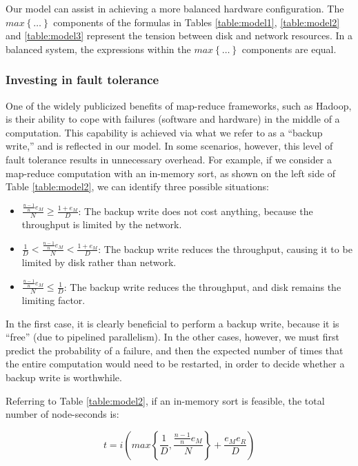 \documentclass{acm_proc_article-sp}
\begin{document}
Our model can assist in achieving a more balanced
hardware configuration. The $max\left\{\ldots\right\}$ components of the
formulas in Tables \ref{table:model1}, \ref{table:model2} and
\ref{table:model3} represent the tension between disk and network resources. In
a balanced system, the expressions within the $max\left\{\ldots\right\}$
components are equal.

\subsubsection{Investing in fault tolerance}

One of the widely publicized benefits of map-reduce frameworks, such as Hadoop,
is their ability to cope with failures (software and hardware) in the middle of
a computation. This capability is achieved via what we refer to as a ``backup
write,'' and is reflected in our model. In some scenarios, however, this level
of fault tolerance results in unnecessary overhead. For example, if we consider
a map-reduce computation with an in-memory sort, as shown on the left side of
Table \ref{table:model2}, we can identify three possible situations:

\begin{itemize}
  \item $\frac{\frac{n-1}{n} e_M}{N} \ge \frac{1+e_M}{D}$: The backup write does
  not cost anything, because the throughput is limited by the network.
  \item $\frac{1}{D} < \frac{\frac{n-1}{n} e_M}{N} < \frac{1+e_M}{D}$: The
  backup write reduces the throughput, causing it to be limited by disk rather than network.
  \item $\frac{\frac{n-1}{n} e_M}{N} \le \frac{1}{D}$: The backup write reduces
  the throughput, and disk remains the limiting factor.
\end{itemize}

In the first case, it is clearly beneficial to perform a backup write, because
it is ``free'' (due to pipelined parallelism). In the other cases, however, we
must first predict the probability of a failure, and then the expected number
of times that the entire computation would need to be restarted, in order to
decide whether a backup write is worthwhile.

Referring to Table \ref{table:model2}, if an in-memory sort is feasible, the
total number of node-seconds is:

\begin{equation*}
t = i \left( max\left\{\frac{1}{D},
\frac{\frac{n-1}{n} e_M}{N}\right\} + \frac{e_M e_R}{D} \right)
\end{equation*}
\end{document}
